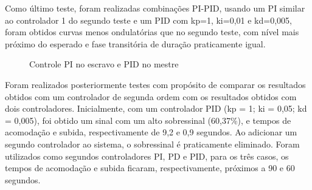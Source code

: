 \documentclass[a4paper,12pt]{article}
\begin{document}
Como último teste, foram realizadas combinações PI-PID, usando um PI similar ao controlador 1 do segundo teste e um PID com kp=1, ki=0,01 e kd=0,005, foram obtidos curvas menos ondulatórias que no segundo teste, com nível mais próximo do esperado e fase transitória de duração praticamente igual.
\begin{figure}[H]
     \centering
\hspace{1cm}
     
     \caption{Controle PI no escravo e PID no mestre}
     \label{fig:ControlePI}
\end{figure}

\hspace{4ex}Foram realizados posteriormente testes com propósito de comparar os resultados obtidos com um controlador de segunda ordem com os resultados obtidos com dois controladores. Inicialmente, com um controlador PID (kp = 1; ki = 0,05; kd = 0,005), foi obtido um sinal com um alto sobressinal (60,37\%), e tempos de acomodação e subida, respectivamente de 9,2 e 0,9 segundos. Ao adicionar um segundo controlador ao sistema, o sobressinal é praticamente eliminado. Foram utilizados como segundos controladores PI, PD e PID, para os três casos, os tempos de acomodação e subida ficaram, respectivamente, próximos a 90 e 60 segundos. 
\end{document}
